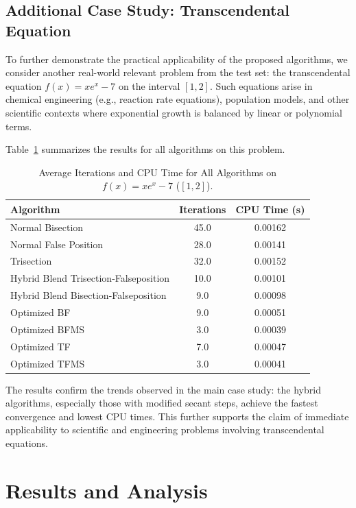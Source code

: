 \documentclass[amsmath, amssymb, aps]{revtex4-2}
\begin{document}
\subsection*{Additional Case Study: Transcendental Equation}
To further demonstrate the practical applicability of the proposed algorithms, we consider another real-world relevant problem from the test set: the transcendental equation $f(x) = x e^x - 7$ on the interval $[1, 2]$. Such equations arise in chemical engineering (e.g., reaction rate equations), population models, and other scientific contexts where exponential growth is balanced by linear or polynomial terms.

Table~\ref{tab:realworld2} summarizes the results for all algorithms on this problem.

\begin{table}[H]
\centering
\caption{Average Iterations and CPU Time for All Algorithms on $f(x) = x e^x - 7$ ($[1,2]$).}
\label{tab:realworld2}
\begin{tabular}{lcc}
\toprule
Algorithm & Iterations & CPU Time (s) \\
\midrule
Normal Bisection & 45.0 & 0.00162 \\
Normal False Position & 28.0 & 0.00141 \\
Trisection & 32.0 & 0.00152 \\
Hybrid Blend Trisection-Falseposition & 10.0 & 0.00101 \\
Hybrid Blend Bisection-Falseposition & 9.0 & 0.00098 \\
Optimized BF & 9.0 & 0.00051 \\
Optimized BFMS & 3.0 & 0.00039 \\
Optimized TF & 7.0 & 0.00047 \\
Optimized TFMS & 3.0 & 0.00041 \\
\bottomrule
\end{tabular}
\end{table}

The results confirm the trends observed in the main case study: the hybrid algorithms, especially those with modified secant steps, achieve the fastest convergence and lowest CPU times. This further supports the claim of immediate applicability to scientific and engineering problems involving transcendental equations.

\section{Results and Analysis}\label{sec:results}
\end{document}
